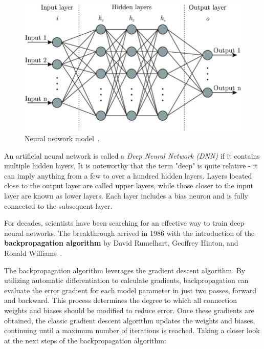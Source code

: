 \begin{figure}[!htb]
    \centering
    \includegraphics[scale=0.5]{Images/nn_model.jpg}
    \caption{Neural network model~\cite{NNModel}.}
    \label{fig:NNModel}
\end{figure}

An artificial neural network is called a \textit{Deep Neural Network (DNN)} if it contains multiple hidden layers. It is noteworthy that the term "deep" is quite relative - it can imply anything from a few to over a hundred hidden layers. Layers located close to the output layer are called upper layers, while those closer to the input layer are known as lower layers. Each layer includes a bias neuron and is fully connected to the subsequent layer.

For decades, scientists have been searching for an effective way to train deep neural networks. The breakthrough arrived in 1986 with the introduction of the \textbf{backpropagation algorithm} by David Rumelhart, Geoffrey Hinton, and Ronald Williams~\cite{UMzUSLiTF}.

The backpropagation algorithm leverages the gradient descent algorithm. By utilizing automatic differentiation to calculate gradients, backpropagation can evaluate the error gradient for each model parameter in just two passes, forward and backward. This process determines the degree to which all connection weights and biases should be modified to reduce error. Once these gradients are obtained, the classic gradient descent algorithm updates the weights and biases, continuing until a maximum number of iterations is reached. Taking a closer look at the next steps of the backpropagation algorithm:


